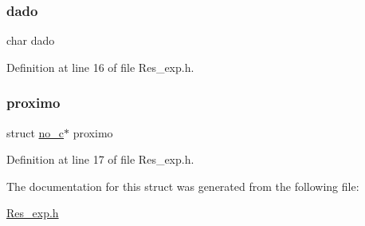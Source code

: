 \subsubsection{\texorpdfstring{dado}{dado}}
{\footnotesize\ttfamily char dado}



Definition at line 16 of file Res\+\_\+exp.\+h.

\mbox{\label{structno__c_ae377ca56965f4c6b7ce1ed7b465bc7e9}} 
\subsubsection{\texorpdfstring{proximo}{proximo}}
{\footnotesize\ttfamily struct \mbox{\hyperlink{structno__c}{no\+\_\+c}}$\ast$ proximo}



Definition at line 17 of file Res\+\_\+exp.\+h.



The documentation for this struct was generated from the following file\+:\begin{DoxyCompactItemize}
\item 
\mbox{\hyperlink{_res__exp_8h}{Res\+\_\+exp.\+h}}\end{DoxyCompactItemize}
